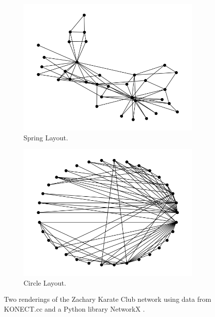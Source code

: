 \begin{figure}
    \begin{center}
        \begin{subfigure}[b]{0.45\textwidth}
            \includegraphics[width=\textwidth]{img/zachary_spring}
            \caption{Spring Layout.}
            \label{fig:zachary_spring}
        \end{subfigure}
        \begin{subfigure}[b]{0.45\textwidth}
            \includegraphics[width=\textwidth]{img/zachary_circle}
            \caption{Circle Layout.}
            \label{fig:zachary_circle}
        \end{subfigure}
    \end{center}
    \caption{Two renderings of the Zachary Karate Club network using data from KONECT.cc \cite{konect} and a Python library NetworkX \cite{SciPyProceedings_11}.}
    \label{fig:zachary_digrams}
\end{figure}

